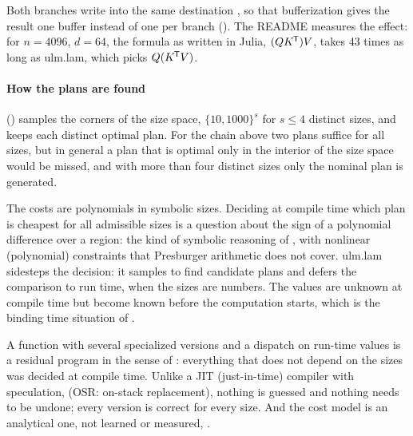 Both branches write into the same destination , so that
bufferization gives the  result one buffer instead of one per
branch (). The README measures the
effect: for \(n=4096\), \(d=64\), the formula as written in Julia,
\((QK^{\mkern-1.5mu\mathsf{T}})V\), takes 43 times as long as ulm.lam, which picks \(Q(K^{\mkern-1.5mu\mathsf{T}} V)\).

\paragraph{How the plans are found} 
() samples the corners of the size
space, \(\{10, 1000\}^s\) for \(s \le 4\) distinct sizes, and keeps each
distinct optimal plan. For the chain above two plans suffice for all sizes,
but in general a plan that is optimal only in the interior of the size
space would be missed, and with more than four distinct sizes only the
nominal plan is generated.

\begin{theory}
The costs are polynomials in symbolic sizes. Deciding at compile time which
plan is cheapest for all admissible sizes is a question about the sign of a
polynomial difference over a region: the kind of symbolic reasoning of
, with nonlinear (polynomial)
constraints that Presburger arithmetic does not cover. ulm.lam sidesteps the
decision: it samples to find candidate plans and defers the comparison to
run time, when the sizes are numbers. The values are unknown at compile
time but become known before the computation starts, which is the binding
time situation of .
\end{theory}

\begin{theory}
A function with several specialized versions and a dispatch on run-time
values is a residual program in the sense of
: everything that
does not depend on the sizes was decided at compile time. Unlike a JIT
(just-in-time) compiler with speculation,  (OSR: on-stack replacement), nothing is guessed and nothing needs to be
undone; every version is correct for every size. And the cost model is an
analytical one, not learned or measured, .
\end{theory}

